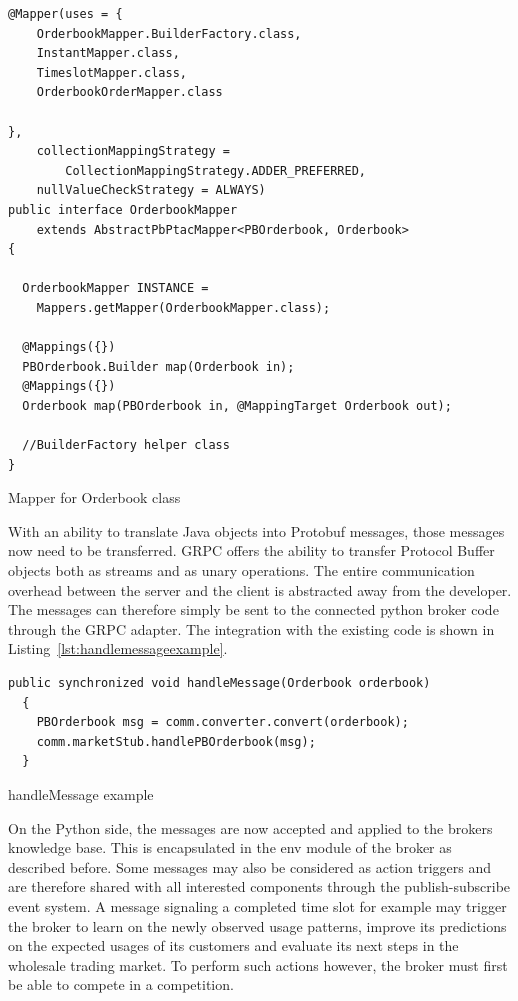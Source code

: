 \begin{listing}[]
    \begin{verbatim}
@Mapper(uses = {
    OrderbookMapper.BuilderFactory.class,
    InstantMapper.class,
    TimeslotMapper.class,
    OrderbookOrderMapper.class

},
    collectionMappingStrategy =
        CollectionMappingStrategy.ADDER_PREFERRED,
    nullValueCheckStrategy = ALWAYS)
public interface OrderbookMapper
    extends AbstractPbPtacMapper<PBOrderbook, Orderbook>
{

  OrderbookMapper INSTANCE =
    Mappers.getMapper(OrderbookMapper.class);

  @Mappings({})
  PBOrderbook.Builder map(Orderbook in);
  @Mappings({})
  Orderbook map(PBOrderbook in, @MappingTarget Orderbook out);

  //BuilderFactory helper class
}
    \end{verbatim}
    \caption{Mapper for Orderbook class}
    \label{lst:mapperexample}
\end{listing}

With an ability to translate Java objects into Protobuf messages, those messages now need to be transferred. \ac {GRPC}
offers the ability to transfer Protocol Buffer objects both as streams and as unary operations. The entire communication
overhead between the server and the client is abstracted away from the developer. The messages can therefore simply be
sent to the connected python broker code through the \ac {GRPC} adapter. The integration with the existing code is shown
in Listing~\ref{lst:handlemessageexample}.

\begin{listing}
    \begin{verbatim}
public synchronized void handleMessage(Orderbook orderbook)
  {
    PBOrderbook msg = comm.converter.convert(orderbook);
    comm.marketStub.handlePBOrderbook(msg);
  }
    \end{verbatim}
    \caption{handleMessage example}
    \label{lst:handlemessageexample}
\end{listing}

On the Python side, the messages are now accepted and applied to the brokers knowledge base. This is encapsulated in the
env module of the broker as described before. Some messages may also be considered as action triggers and are therefore
shared with all interested components through the publish-subscribe event system. A message signaling a completed
time slot for example may trigger the broker to learn on the newly observed usage patterns, improve its predictions on
the expected usages of its customers and evaluate its next steps in the wholesale trading market. To perform such
actions however, the broker must first be able to compete in a competition.

